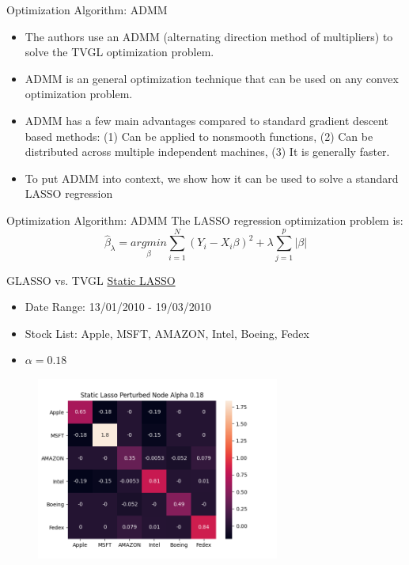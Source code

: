 \documentclass{beamer}
\begin{document}
\begin{frame}{Optimization Algorithm: ADMM}

	\begin{itemize}
		\item The authors use an ADMM (alternating direction method of multipliers) to solve the TVGL optimization problem.
		\item ADMM is an general optimization technique that can be used on any convex optimization problem. 
		\item ADMM has a few main advantages compared to standard gradient descent based methods: (1) Can be applied to nonsmooth functions, (2) Can be distributed across multiple independent machines, (3) It is generally faster.
		\item To put ADMM into context, we show how it can be used to solve a standard LASSO regression
	\end{itemize}
\end{frame}

\begin{frame}{Optimization Algorithm: ADMM}
	The LASSO regression optimization problem is:
\[\hat{\beta}_{\lambda} = \underset{\beta}{argmin} \sum_{i=1}^{N} (Y_{i} - X_{i} \beta)^{2} + \lambda \sum_{j=1}^{p} |\beta|\]
\end{frame}

\begin{frame}{GLASSO vs. TVGL}
\underline{Static LASSO}

\begin{itemize}
  \item Date Range: 13/01/2010 - 19/03/2010
  \item Stock List: Apple, MSFT, AMAZON, Intel, Boeing, Fedex
  \item $\alpha = 0.18$
\end{itemize}

  \begin{figure}
    \includegraphics[width=8cm]{Static_Psi5_alpha0.18.png}
    \label{fig:static5_0.18}
  \end{figure}

\end{frame}
\end{document}
